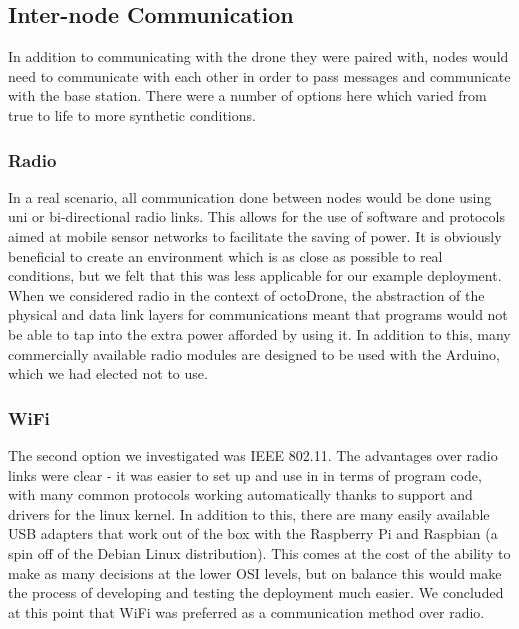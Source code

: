 \subsection{Inter-node Communication}
In addition to communicating with the drone they were paired with, nodes would need to communicate with each other in order to pass messages and communicate with the base station. There were a number of options here which varied from true to life to more synthetic conditions.

\subsubsection{Radio}
In a real scenario, all communication done between nodes would be done using uni or bi-directional radio links. This allows for the use of software and protocols aimed at mobile sensor networks to facilitate the saving of power. It is obviously beneficial to create an environment which is as close as possible to real conditions, but we felt that this was less applicable for our example deployment. When we considered radio in the context of octoDrone, the abstraction of the physical and data link layers for communications meant that programs would not be able to tap into the extra power afforded by using it. In addition to this, many commercially available radio modules are designed to be used with the Arduino, which we had elected not to use.

\subsubsection{WiFi}
The second option we investigated was IEEE 802.11. The advantages over radio links were clear - it was easier to set up and use in in terms of program code, with many common protocols working automatically thanks to support and drivers for the linux kernel. In addition to this, there are many easily available USB adapters that work out of the box with the Raspberry Pi and Raspbian (a spin off of the Debian Linux distribution). This comes at the cost of the ability to make as many decisions at the lower OSI levels, but on balance this would make the process of developing and testing the deployment much easier. We concluded at this point that WiFi was preferred as a communication method over radio.

